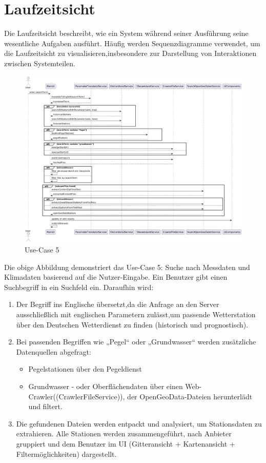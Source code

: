 \documentclass[a4paper,12pt]{scrreprt}
\begin{document}
\section*{\large \textbf{Laufzeitsicht}}
Die Laufzeitsicht beschreibt, wie ein System während seiner Ausführung seine wesentliche Aufgaben ausführt. Häufig werden Sequenzdiagramme verwendet, um die Laufzeitsicht zu visualisieren,insbesondere zur Darstellung von Interaktionen zwischen Systemteilen.
\begin{figure}[H]
	\includegraphics[width=18.5cm]{Such-Algorithmus.png}
	\caption{\label{} Use-Case 5}
\end{figure}
Die obige Abbildung demonstriert das Use-Case 5: Suche nach Messdaten und Klimadaten basierend auf die Nutzer-Eingabe. Ein Benutzer gibt einen Suchbegriff in ein Suchfeld ein. Daraufhin wird:  
\begin{enumerate}
	\item Der Begriff ins Englische übersetzt,da die Anfrage an den Server ausschließlich mit englischen Parametern zulässt,um passende Wetterstation über den Deutschen Wetterdienst zu finden (historisch und prognostisch).
	\item Bei passenden Begriffen wie „Pegel“ oder „Grundwasser“ werden zusätzliche Datenquellen abgefragt:
	\begin{itemize}
		\item Pegelstationen über den Pegeldienst
		\item Grundwasser - oder Oberflächendaten über einen Web-Crawler((CrawlerFileService)), der OpenGeoData-Dateien herunterlädt und filtert.
	\end{itemize}
	\item Die gefundenen Dateien werden entpackt und analysiert, um Stationsdaten zu extrahieren. Alle Stationen werden zusammengeführt, nach Anbieter gruppiert und dem Benutzer im UI (Gitteransicht + Kartenansicht + Filtermöglichkeiten) dargestellt.
\end{enumerate}
\end{document}
